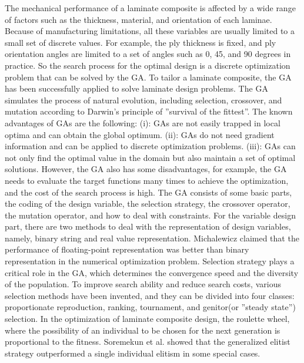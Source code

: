 The mechanical performance of a laminate composite is affected by a wide range of factors such as the
thickness, material, and orientation of each laminae. Because of manufacturing limitations, all these
variables are usually limited to a small set of discrete values. For example, the ply thickness is fixed,
and ply orientation angles are limited to a set of angles such as 0, 45, and 90 degrees in practice. So
the search process for the optimal design is a discrete optimization problem that can be solved by the
GA. To tailor a laminate composite, the GA has been successfully applied to solve laminate design
problems\cite{riche1993optimization,nagendra1996improved,sadagopan1998application,todoroki1998stacking,liu2000permutation,sivakumar1998optimum,walker2003technique,lin2004stacking,kang2005minimum,murugan2007target,akbulut2008optimum}.
The GA simulates the process of natural evolution, including selection, crossover, and mutation
according to Darwin's principle of ''survival of the fittest''. The known advantages of GAs are the
following: (i): GAs are not easily trapped in local optima and can obtain the global
optimum. (ii): GAs do not need gradient information and can be applied to discrete optimization
problems. (iii): GAs can not only find the optimal value in the domain but also maintain a
set of optimal solutions. However, the GA also has some disadvantages, for example, the GA
needs to evaluate the target functions many times to achieve the optimization, and the cost of the
search process is high. The GA consists of some basic parts, the coding of the design variable,
the selection strategy, the crossover operator, the mutation operator, and how to deal with constraints. For the
variable design part, there are two methods to deal with the representation of design variables, namely,
binary string and real value representation\cite{riche1993optimization,todoroki1998stacking}.
Michalewicz\cite{zbigniew1996genetic} claimed that the performance of floating-point representation was
better than binary representation in the numerical optimization problem. Selection strategy plays a
critical role in the GA, which determines the convergence speed and the diversity of the population. To
improve search ability and reduce search costs, various selection methods have been invented, and they
can be divided into four classes: proportionate reproduction, ranking, tournament, and
genitor(or ''steady state'') selection. In the optimization of laminate composite design, the roulette
wheel\cite{riche1993optimization,seresta2007optimal}, where the possibility of an individual to be
chosen for the next generation is proportional to the fitness.
Soremekun et al.\cite{soremekun2001composite} showed that the generalized elitist strategy outperformed a
single individual elitism in some special cases.

